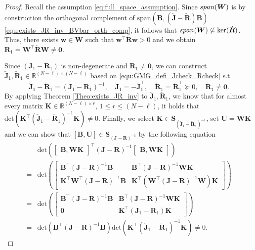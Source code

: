 \documentclass[10pt,a4paper]{amsart}
\newcommand{\FOMsize}{N}
\newcommand{\Jcheck}{\check{\bmJ}}
\newcommand{\R}{\mathbb{R}}
\newcommand{\ROMsize}{r}
\newcommand{\Rcheck}{\check{\bmR}}
\newcommand{\bmB}{\bm{B}}
\newcommand{\bmJ}{\bm{J}}
\newcommand{\bmK}{\bm{K}}
\newcommand{\bmR}{\bm{R}}
\newcommand{\bmU}{\bm{U}}
\newcommand{\bmW}{\bm{W}}
\newcommand{\bzero}{\mathbf{0}}
\newcommand{\matset}{\mathbf{S}}
\begin{document}
\begin{proof}
Recall the assumption \eqref{eq:full_space_assumption}. Since $\textnormal{span}(\bmW)$ is by construction the orthogonal complement of $\mathrm{span}(
					\bmB, (\Jcheck-\Rcheck)\bmB)$ \eqref{equ:exists_JR_inv_BVbar_orth_comp}, it follows that $\textnormal{span}(\bmW) \not\subseteq \mathrm{ker}(\Rcheck)$. Thus, there exists $\bm{w} \in \bmW$ such that $\bm{w}^{\top} \Rcheck \bm{w} >0$ and we obtain $\bmR_1 = \bmW^{\top}\Rcheck\bmW \neq \bzero$.	
					
Since $(\bmJ_1-\bmR_1)$ is non-degenerate and $\bmR_1 \neq \bzero$, we can construct $\Jcheck_1,\Rcheck_1\in\R^{(\FOMsize-\ell)\times(\FOMsize-\ell)}$ based on \eqref{equ:GMG_defi_Jcheck_Rcheck} s.t.
			\begin{equation*}
				\Jcheck_1-\Rcheck_1 = (\bmJ_1-\bmR_1)^{-1},\quad
				\Jcheck_1=-\Jcheck_1^{\top},\quad
				\Rcheck_1 =\Rcheck_1^{\top}\succeq 0,\quad
				\Rcheck_1\neq \bzero.				
			\end{equation*}
By applying Theorem \ref{Theo:exists_JR_inv} to $\Jcheck_1, \Rcheck_1$, we know that for almost every matrix $\bmK\in\R^{(\FOMsize-\ell)\times \ROMsize}$, $1 \leq \ROMsize\leq(\FOMsize-\ell)$, it holds that $\mathrm{det}(\bmK^{\top}(\Jcheck_1-\Rcheck_1)^{-1}\bmK)\neq 0$.
			Finally, we select $\bmK\in\matset_{(\Jcheck_1-\Rcheck_1)^{-1}}$, set $\bmU= \bmW\bmK$ and we can show that $[\bmB,\bmU]\in\matset_{(\bmJ-\bmR)^{-1}}$ by the following equation
			\begin{align*}
				&\mathrm{det}\left(
				\begin{bmatrix}
					\bmB,\bmW\bmK
				\end{bmatrix}^{\top}
				(\bmJ-\bmR)^{-1}
				\begin{bmatrix}
					\bmB,\bmW\bmK
				\end{bmatrix}
				\right)
				\\
				=
				&
				\mathrm{det}\left(
				\begin{bmatrix}
					\bmB^{\top}	(\bmJ-\bmR)^{-1}\bmB&
					\bmB^{\top}	(\bmJ-\bmR)^{-1}\bmW\bmK\\
					\bmK^{\top}\bmW^{\top}(\bmJ-\bmR)^{-1}\bmB&
					\bmK^{\top}(\bmW^{\top}(\bmJ-\bmR)^{-1}\bmW)\bmK
				\end{bmatrix}
				\right)
				\\
				=
				&
				\mathrm{det}\left(
				\begin{bmatrix}
					\bmB^{\top}	(\bmJ-\bmR)^{-1}\bmB&
					\bmB^{\top}	(\bmJ-\bmR)^{-1}\bmW\bmK\\
					\bzero&
					\bmK^{\top}(\bmJ_1-\bmR_1)\bmK
				\end{bmatrix}
				\right)
				\\
				=
				&
				\mathrm{det}\left(\bmB^{\top}	(\bmJ-\bmR)^{-1}\bmB\right)
				\mathrm{det}\left(\bmK^{\top}(\Jcheck_1-\Rcheck_1)^{-1}\bmK\right)
				\neq
				0.
\end{align*}							
\end{proof}					
\end{document}
